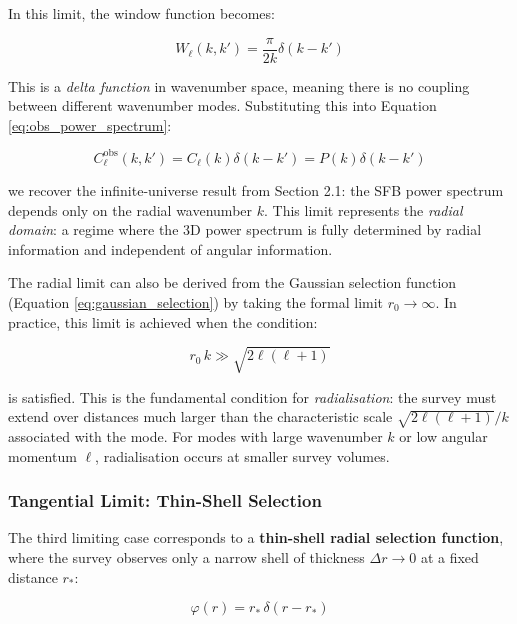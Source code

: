 In this limit, the window function becomes:

\begin{equation}
W_\ell(k, k') = \frac{\pi}{2k} \delta(k - k')
\label{eq:radial_limit_window}
\end{equation}

This is a \emph{delta function} in wavenumber space, meaning there is no coupling between different wavenumber modes. Substituting this into Equation \ref{eq:obs_power_spectrum}:

\begin{equation}
C_\ell^{\text{obs}}(k, k') = C_\ell(k) \delta(k - k') = P(k) \delta(k - k')
\label{eq:radial_limit_power}
\end{equation}

we recover the infinite-universe result from Section 2.1: the SFB power spectrum depends only on the radial wavenumber $k$. This limit represents the \emph{radial domain}: a regime where the 3D power spectrum is fully determined by radial information and independent of angular information.

The radial limit can also be derived from the Gaussian selection function (Equation \ref{eq:gaussian_selection}) by taking the formal limit $r_0 \to \infty$. In practice, this limit is achieved when the condition:

\begin{equation}
r_0 \, k \gg \sqrt{2\ell(\ell+1)}
\label{eq:radialisation_condition}
\end{equation}

is satisfied. This is the fundamental condition for \emph{radialisation}: the survey must extend over distances much larger than the characteristic scale $\sqrt{2\ell(\ell+1)} / k$ associated with the mode. For modes with large wavenumber $k$ or low angular momentum $\ell$, radialisation occurs at smaller survey volumes.

\subsubsection{Tangential Limit: Thin-Shell Selection}

The third limiting case corresponds to a \textbf{thin-shell radial selection function}, where the survey observes only a narrow shell of thickness $\Delta r \to 0$ at a fixed distance $r_*$:

\begin{equation}
\varphi(r) = r_* \, \delta(r - r_*)
\label{eq:thin_shell_selection}
\end{equation}

